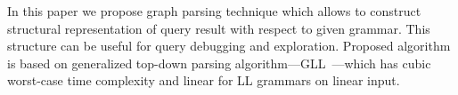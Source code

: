 \documentclass{sig-alternate} %
\begin{document}
In this paper we propose graph parsing technique which allows to construct structural representation of query result with respect to given grammar.
This structure can be useful for query debugging and exploration. 
Proposed algorithm is based on generalized top-down parsing algorithm---GLL~\cite{scott2010gll}---which has cubic worst-case time complexity and linear for LL grammars on linear input.  














\balancecolumns
\end{document}
